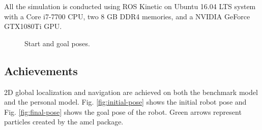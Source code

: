 \documentclass[10pt,journal,compsoc]{IEEEtran}
\begin{document}
All the simulation is conducted using ROS Kinetic on Ubuntu 16.04 LTS system with a Core i7-7700 CPU, two 8 GB DDR4 memories, and a NVIDIA GeForce GTX1080Ti GPU. 

\begin{figure}[thpb]
      \centering
      \hfill
      \caption{Start and goal poses.}
\end{figure}

\subsection{Achievements}
2D global localization and navigation are achieved on both the benchmark model and the personal model. Fig. \ref{fig:initial-pose} shows the initial robot pose and Fig. \ref{fig:final-pose} shows the goal pose of the robot. Green arrows represent particles created by the amcl package.
\end{document}
